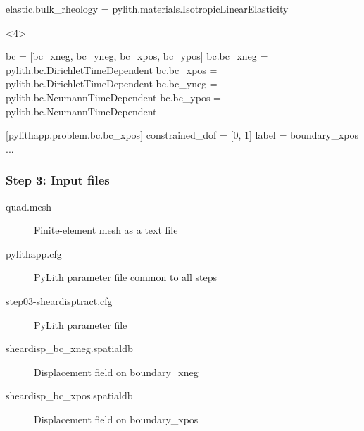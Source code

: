 \documentclass[aspectratio=169]{beamer}
\begin{document}
\begin{frame}[t,fragile]
\begin{minipage}[t]{0.60\textwidth}
\begin{onlyenv}
\begin{cfgcode}
        elastic.bulk_rheology = pylith.materials.IsotropicLinearElasticity
      \end{cfgcode}
    \end{onlyenv}
    \begin{onlyenv}<4>
      \begin{cfgcode}
        bc = [bc_xneg, bc_yneg, bc_xpos, bc_ypos]
        bc.bc_xneg = pylith.bc.DirichletTimeDependent
        bc.bc_xpos = pylith.bc.DirichletTimeDependent
        bc.bc_yneg = pylith.bc.NeumannTimeDependent
        bc.bc_ypos = pylith.bc.NeumannTimeDependent
        
        [pylithapp.problem.bc.bc_xpos]
        constrained_dof = [0, 1]
        label = boundary_xpos
        ...
      \end{cfgcode}
    \end{onlyenv}
  \end{minipage}

    

  
\end{frame}


\begin{frame}
  \frametitle{Step 3: Input files}
  \summary{}

  \begin{description}
  \item[quad.mesh] Finite-element mesh as a text file
  \item[pylithapp.cfg] PyLith parameter file common to all steps
  \item[step03-sheardisptract.cfg] PyLith parameter file
  \item[sheardisp\_bc\_xneg.spatialdb] Displacement field on boundary\_xneg
  \item[sheardisp\_bc\_xpos.spatialdb] Displacement field on boundary\_xpos
  \end{description}
    
\end{frame}
\end{document}
